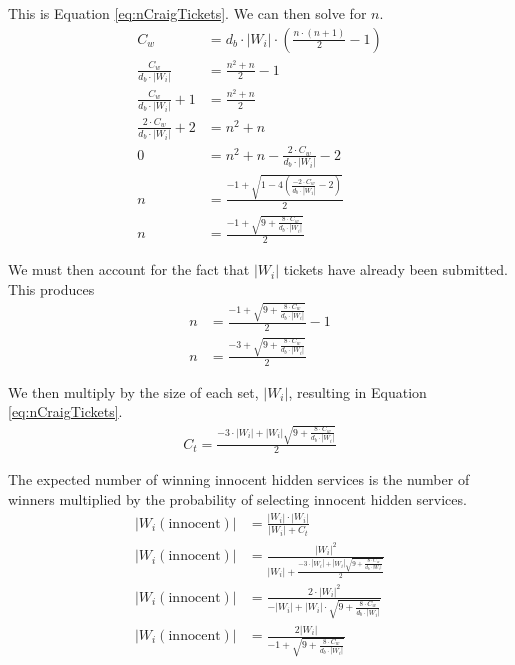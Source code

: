 \documentclass[USenglish,oneside,twocolumn]{article}
\newcommand*\nWinners{\left\vert{W_{i}}\right\vert}
\begin{document}
This is Equation \ref{eq:nCraigTickets}. We can then solve for $ n $. %
\begin{align*}
	C_{w} &= d_{b} \cdot \nWinners \cdot (\frac{n \cdot  (n+1)}{2} - 1) \\
	\frac{C_{w}}{d_{b} \cdot \nWinners} &= \frac{n^{2} + n}{2} - 1 \\
	\frac{C_{w}}{d_{b} \cdot \nWinners} + 1 &= \frac{n^{2} + n}{2} \\
	\frac{2 \cdot C_{w}}{d_{b} \cdot \nWinners} + 2 &= n^{2} + n \\
	0 &= n^{2} + n - \frac{2 \cdot C_{w}}{d_{b} \cdot \nWinners} - 2 \\
	n &= \frac{-1 + \sqrt{1 - 4(\frac{-2 \cdot C_{w}}{d_{b} \cdot \nWinners} - 2)}}{2} \\
	n &= \frac{-1 + \sqrt{9 + \frac{8 \cdot C_{w}}{d_{b} \cdot \nWinners}}}{2}
\end{align*}

\newpage

We must then account for the fact that $ \nWinners $ tickets have already been submitted. This produces 
\begin{align*}
	n &= \frac{-1 + \sqrt{9 + \frac{8 \cdot C_{w}}{d_{b} \cdot \nWinners}}}{2} - 1 \\
	n &= \frac{-3 + \sqrt{9 + \frac{8 \cdot C_{w}}{d_{b} \cdot \nWinners}}}{2}
\end{align*}

We then multiply by the size of each set, $ \nWinners $, resulting in Equation \ref{eq:nCraigTickets}.
\begin{align*}
	C_{t} = \frac{-3 \cdot \nWinners + \nWinners \sqrt{9 + \frac{8 \cdot C_{w}}{d_{b} \cdot \nWinners}}}{2}
\end{align*}

The expected number of winning innocent hidden services is the number of winners multiplied by the probability of selecting innocent hidden services.
\begin{align*}
	\left\vert{W_{i}(\mathrm{innocent})}\right\vert &= \frac{\nWinners \cdot \nWinners}{\nWinners + C_{t}} \\
	\left\vert{W_{i}(\mathrm{innocent})}\right\vert &= \frac{\nWinners^{2}}{\nWinners + \frac{-3 \cdot \nWinners + \nWinners \sqrt{9 + \frac{8 \cdot C_{w}}{d_{b} \cdot \nWinners}}}{2}} \\
	\left\vert{W_{i}(\mathrm{innocent})}\right\vert &= \frac{2 \cdot \nWinners^{2}}{-\nWinners + \nWinners \cdot \sqrt{9 + \frac{8 \cdot C_{w}}{d_{b} \cdot \nWinners}}} \\
	\left\vert{W_{i}(\mathrm{innocent})}\right\vert &= \frac{2 \nWinners}{-1 + \sqrt{9 + \frac{8 \cdot C_{w}}{d_{b} \cdot \nWinners}}}
\end{align*}
\end{document}
